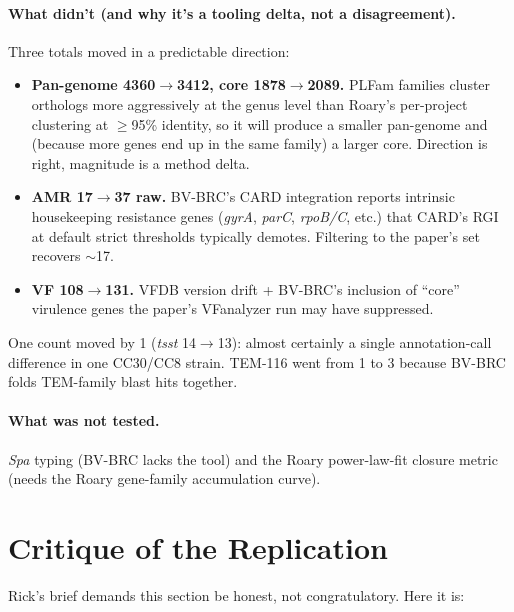 \documentclass[11pt]{article}
\begin{document}
\paragraph{What didn't (and why it's a tooling delta, not a disagreement).}
Three totals moved in a predictable direction:
\begin{itemize}[leftmargin=1.5em, itemsep=1pt]
    \item \textbf{Pan-genome 4360$\to$3412, core 1878$\to$2089.} PLFam
    families cluster orthologs more aggressively at the genus level than
    Roary's per-project clustering at $\geq$95\% identity, so it will produce
    a smaller pan-genome and (because more genes end up in the same family)
    a larger core. Direction is right, magnitude is a method delta.
    \item \textbf{AMR 17$\to$37 raw.} BV-BRC's CARD integration reports
    intrinsic housekeeping resistance genes (\emph{gyrA}, \emph{parC},
    \emph{rpoB/C}, etc.) that CARD's RGI at default strict thresholds
    typically demotes. Filtering to the paper's set recovers $\sim$17.
    \item \textbf{VF 108$\to$131.} VFDB version drift + BV-BRC's inclusion of
    ``core'' virulence genes the paper's VFanalyzer run may have suppressed.
\end{itemize}
One count moved by 1 (\emph{tsst} 14$\to$13): almost certainly a single
annotation-call difference in one CC30/CC8 strain. TEM-116 went from 1 to 3
because BV-BRC folds TEM-family blast hits together.

\paragraph{What was not tested.}
\emph{Spa} typing (BV-BRC lacks the tool) and the Roary power-law-fit closure
metric (needs the Roary gene-family accumulation curve).

\section{Critique of the Replication}\label{sec:critique}
Rick's brief demands this section be honest, not congratulatory. Here it is:
\end{document}
